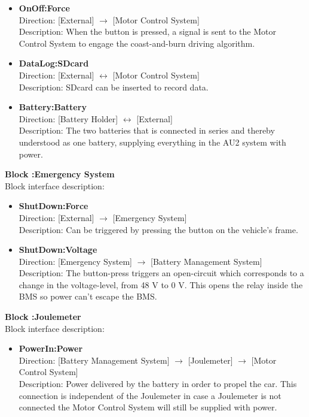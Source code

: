 \begin{itemize}
	\item \textbf{OnOff:Force}\\
	Direction: [External] $\rightarrow$ [Motor Control System]\\
	Description: When the button is pressed, a signal is sent to the Motor Control System to engage the coast-and-burn driving algorithm. 
	\item \textbf{DataLog:SDcard}\\
	Direction: [External] $\leftrightarrow$ [Motor Control System]\\
	Description: SDcard can be inserted to record data.
	\item \textbf{Battery:Battery}\\
	Direction: [Battery Holder] $\leftrightarrow$ [External]\\
	Description: The two batteries that is connected in series and thereby understood as one battery, supplying everything in the AU2 system with power.
\end{itemize}

\textbf{Block :Emergency System}\\
Block interface description:
\begin{itemize}
	\item \textbf{ShutDown:Force}\\
	Direction: [External] $\rightarrow$ [Emergency System]\\
	Description: Can be triggered by pressing the button on the vehicle's frame.
	\item \textbf{ShutDown:Voltage}\\
	Direction: [Emergency System] $\rightarrow$ [Battery Management System]\\
	Description: The button-press triggers an open-circuit which corresponds to a change in the voltage-level, from 48 V to 0 V. This opens the relay inside the BMS so power can't escape the BMS.
\end{itemize}

\textbf{Block :Joulemeter}\\
Block interface description:
\begin{itemize}
	\item \textbf{PowerIn:Power}\\
	Direction: [Battery Management System] $\rightarrow$ [Joulemeter] $\rightarrow$ [Motor Control System]\\
	Description: Power delivered by the battery in order to propel the car. This connection is independent of the Joulemeter in case a Joulemeter is not connected the Motor Control System will still be supplied with power.
\end{itemize}

